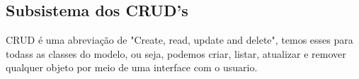 \documentclass[11pt, a4paper]{article}
\begin{document}
            \subsection{Subsistema dos CRUD's}
                CRUD é uma abreviação de "Create, read, update and delete", temos esses para todass as classes do modelo, ou seja, podemos criar, listar, atualizar e remover qualquer objeto por meio de uma interface com o usuario.
            
		
		
		
		
		        
		
\end{document}
